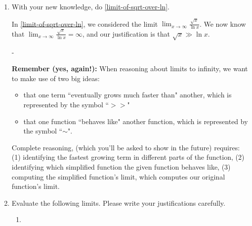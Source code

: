 \documentclass{article}
\makeatletter
\newlength{\tipmargin}
\renewenvironment{framed}{
  \setlength{\tipmargin}{\textwidth-\linewidth}
  \advance\@totalleftmargin-\tipmargin
  \def\FrameCommand{\hspace{\tipmargin}\fbox}%
  \advance\linewidth\tipmargin
  \MakeFramed {\advance\hsize-\width \FrameRestore}%
}
{\endMakeFramed}
\makeatother
\begin{document}
\begin{enumerate}[resume]
\item 


  \begin{problem}[\vfill]
    With your new knowledge, do \ref{limit-of-sqrt-over-ln}. 
  \end{problem}

  \begin{solution}
    In \ref{limit-of-sqrt-over-ln}, we considered the limit 
    $\displaystyle \lim_{x \to \infty} \frac{\sqrt{x}}{\ln x}$. We now
    know that $\displaystyle \lim_{x \to \infty} \frac{\sqrt{x}}{\ln x} = \infty$, and our justification is that $\sqrt{x} \gg \ln x$. 
  \end{solution}

\begin{framed}
{\bf Remember (yes, again!):} When reasoning about limits to infinity, we want to make use of two big ideas:\begin{itemize} 
\item  that one term ``eventually grows much faster than" another, which is represented by the symbol ``$>>$"
\item that one function ``behaves like" another function, which is represented by the symbol ``$\sim$".
\end{itemize}
Complete reasoning, (which you'll be asked to show in the future) requires: (1) identifying the fastest growing term in different parts of the function, (2) identifying which simplified function the given function behaves like, (3) computing the simplified function's limit, which computes our original function's limit.
\end{framed}
\item Evaluate the following limits. Please write your justifications carefully.

  \begin{enumerate}

  \item



\end{enumerate}
\end{enumerate}
\end{document}
